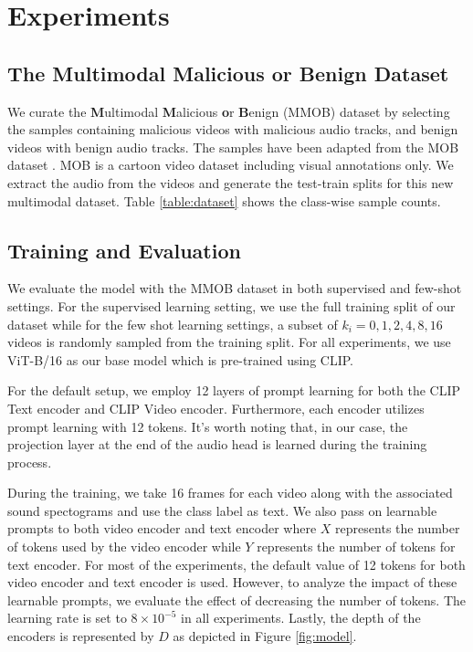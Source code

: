 \documentclass[letterpaper]{article}
\begin{document}
\section{Experiments}\label{BE}
\subsection{The Multimodal Malicious or Benign Dataset}
We curate the \textbf{M}ultimodal \textbf{M}alicious \textbf{o}r \textbf{B}enign (MMOB) dataset by selecting the samples containing malicious videos with malicious audio tracks, and benign videos with benign audio tracks. The samples have been adapted from the MOB dataset \cite{ahmed2023flairs}. MOB is a cartoon video dataset including visual annotations only. We extract the audio from the videos and generate the test-train splits for this new multimodal dataset. %
Table \ref{table:dataset} shows the class-wise sample counts.

\subsection{Training and Evaluation} 
We evaluate the model with the MMOB dataset in both supervised and few-shot settings. For the supervised learning setting, we use the full training split of our dataset while for the few shot learning settings, a subset of $k_i = {0, 1, 2, 4, 8, 16}$ videos is randomly sampled from the training split. For all experiments, we use ViT-B/16 as our base model which is pre-trained using CLIP. 

For the default setup, we employ 12 layers of prompt learning for both the CLIP Text encoder and CLIP Video encoder. Furthermore, each encoder utilizes prompt learning with 12 tokens. It's worth noting that, in our case, the projection layer at the end of the audio head is learned during the training process.


During the training, we take 16 frames for each video along with the associated sound spectograms and use the class label as text. We also pass on learnable prompts to both video encoder and text encoder where $X$ represents the number of tokens used by the video encoder while $Y$ represents the number of tokens for text encoder. For most of the experiments, the default value of 12 tokens for both video encoder and text encoder is used. However, to analyze the impact of these learnable prompts, we evaluate the effect of decreasing the number of tokens.  The learning rate is set to $8\times10^{-5}$ in all experiments. Lastly, the depth of the encoders is represented by $D$ as depicted in Figure \ref{fig:model}.
\end{document}
